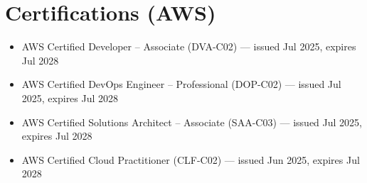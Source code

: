 \section*{Certifications (AWS)}

\begin{itemize}
  \item AWS Certified Developer -- Associate (DVA-C02) --- issued Jul 2025, expires Jul 2028
  \item AWS Certified DevOps Engineer -- Professional (DOP-C02) --- issued Jul 2025, expires Jul 2028
  \item AWS Certified Solutions Architect -- Associate (SAA-C03) --- issued Jul 2025, expires Jul 2028
  \item AWS Certified Cloud Practitioner (CLF-C02) --- issued Jun 2025, expires Jul 2028
\end{itemize}
